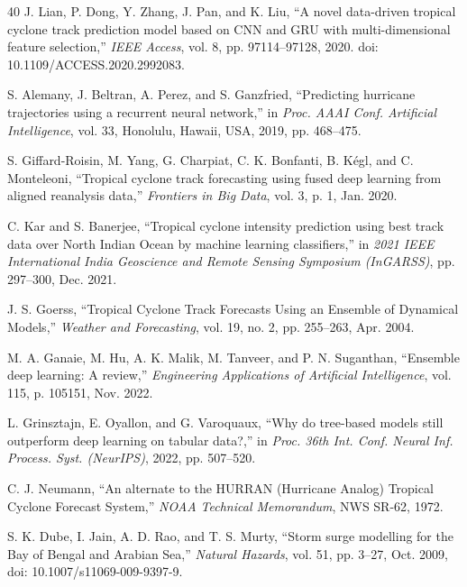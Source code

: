 \documentclass{ametsocv6.1}
\begin{document}
\begin{thebibliography}{40}
J. Lian, P. Dong, Y. Zhang, J. Pan, and K. Liu, ``A novel data-driven tropical cyclone track prediction model based on CNN and GRU with multi-dimensional feature selection,'' \textit{IEEE Access}, vol. 8, pp. 97114--97128, 2020. doi: 10.1109/ACCESS.2020.2992083.

S. Alemany, J. Beltran, A. Perez, and S. Ganzfried, ``Predicting hurricane trajectories using a recurrent neural network,'' in \textit{Proc. AAAI Conf. Artificial Intelligence}, vol. 33, Honolulu, Hawaii, USA, 2019, pp. 468--475.

S. Giffard-Roisin, M. Yang, G. Charpiat, C. K. Bonfanti, B. K\'{e}gl, and C. Monteleoni, ``Tropical cyclone track forecasting using fused deep learning from aligned reanalysis data,'' \textit{Frontiers in Big Data}, vol. 3, p. 1, Jan. 2020.

C. Kar and S. Banerjee, ``Tropical cyclone intensity prediction using best track data over North Indian Ocean by machine learning classifiers,'' in \textit{2021 IEEE International India Geoscience and Remote Sensing Symposium (InGARSS)}, pp. 297--300, Dec. 2021.

J. S. Goerss, ``Tropical Cyclone Track Forecasts Using an Ensemble of Dynamical Models,'' \textit{Weather and Forecasting}, vol. 19, no. 2, pp. 255--263, Apr. 2004.

M. A. Ganaie, M. Hu, A. K. Malik, M. Tanveer, and P. N. Suganthan, ``Ensemble deep learning: A review,'' \textit{Engineering Applications of Artificial Intelligence}, vol. 115, p. 105151, Nov. 2022.

L. Grinsztajn, E. Oyallon, and G. Varoquaux, ``Why do tree-based models still outperform deep learning on tabular data?,'' in \textit{Proc. 36th Int. Conf. Neural Inf. Process. Syst. (NeurIPS)}, 2022, pp. 507--520.

C. J. Neumann, ``An alternate to the HURRAN (Hurricane Analog) Tropical Cyclone Forecast System,'' \textit{NOAA Technical Memorandum}, NWS SR-62, 1972.

S. K. Dube, I. Jain, A. D. Rao, and T. S. Murty, ``Storm surge modelling for the Bay of Bengal and Arabian Sea,'' \textit{Natural Hazards}, vol. 51, pp. 3--27, Oct. 2009, doi: 10.1007/s11069-009-9397-9.


\end{thebibliography}
\end{document}
